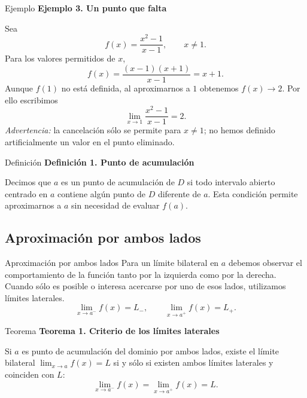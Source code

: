 \documentclass[12pt,aspectratio=169]{beamer}
\begin{document}
\begin{frame}[t,allowframebreaks]{Ejemplo}
{\color{azul}\bfseries Ejemplo 3. Un punto que falta}\par\medskip

Sea
\[
f(x)=\frac{x^2-1}{x-1},\qquad x\ne 1.
\]
Para los valores permitidos de $x$,
\[
f(x)=\frac{(x-1)(x+1)}{x-1}=x+1.
\]
Aunque $f(1)$ no está definida, al aproximarnos a $1$ obtenemos $f(x)\to2$. Por ello escribimos
\[\boxed{\lim_{x\to1}\frac{x^2-1}{x-1}=2.}\]
\emph{Advertencia:} la cancelación sólo se permite para $x\ne1$; no hemos definido artificialmente un valor en el punto eliminado.
\end{frame}


\begin{frame}[t,allowframebreaks]{Definición}
{\color{azul}\bfseries Definición 1. Punto de acumulación}\par\medskip

Decimos que $a$ es un punto de acumulación de $D$ si todo intervalo abierto centrado en $a$ contiene algún punto de $D$ diferente de $a$. Esta condición permite aproximarnos a $a$ sin necesidad de evaluar $f(a)$.
\end{frame}


\subsection{Aproximación por ambos lados}

\begin{frame}[t,allowframebreaks]{Aproximación por ambos lados}
Para un límite bilateral en $a$ debemos observar el comportamiento de la función tanto por la izquierda como por la derecha. Cuando sólo es posible o interesa acercarse por uno de esos lados, utilizamos límites laterales.
\[
\lim_{x\to a^-} f(x)=L_-,\qquad
\lim_{x\to a^+} f(x)=L_+.
\]
\end{frame}


\begin{frame}[t,allowframebreaks]{Teorema}
{\color{azul}\bfseries Teorema 1. Criterio de los límites laterales}\par\medskip

Si $a$ es punto de acumulación del dominio por ambos lados, existe el límite bilateral $\lim_{x\to a}f(x)=L$ si y sólo si existen ambos límites laterales y coinciden con $L$:
\[
\boxed{\lim_{x\to a^-}f(x)=\lim_{x\to a^+}f(x)=L.}
\]
\end{frame}
\end{document}
